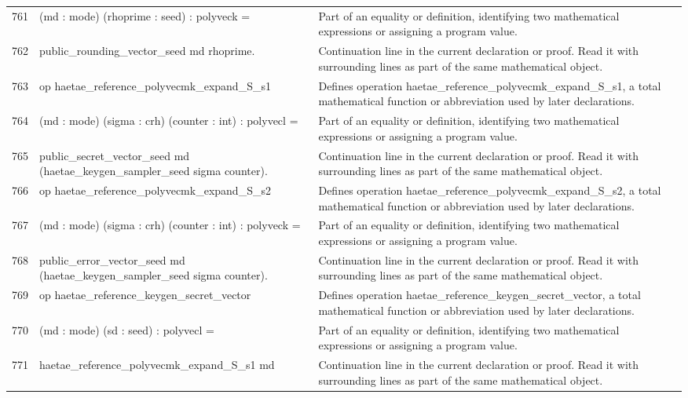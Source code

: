 \documentclass[10pt]{article}
\begin{document}
\begin{longtable}{r L{0.53\textwidth} L{0.37\textwidth}}
761 & {\ttfamily\scriptsize    (md : mode) (rhoprime : seed) : polyveck =} & Part of an equality or definition, identifying two mathematical expressions or assigning a program value. \\
762 & {\ttfamily\scriptsize   public\_rounding\_vector\_seed md rhoprime.} & Continuation line in the current declaration or proof.  Read it with surrounding lines as part of the same mathematical object. \\
763 & {\ttfamily\scriptsize op haetae\_reference\_polyvecmk\_expand\_S\_s1} & Defines operation haetae\_reference\_polyvecmk\_expand\_S\_s1, a total mathematical function or abbreviation used by later declarations. \\
764 & {\ttfamily\scriptsize    (md : mode) (sigma : crh) (counter : int) : polyvecl =} & Part of an equality or definition, identifying two mathematical expressions or assigning a program value. \\
765 & {\ttfamily\scriptsize   public\_secret\_vector\_seed md (haetae\_keygen\_sampler\_seed sigma counter).} & Continuation line in the current declaration or proof.  Read it with surrounding lines as part of the same mathematical object. \\
766 & {\ttfamily\scriptsize op haetae\_reference\_polyvecmk\_expand\_S\_s2} & Defines operation haetae\_reference\_polyvecmk\_expand\_S\_s2, a total mathematical function or abbreviation used by later declarations. \\
767 & {\ttfamily\scriptsize    (md : mode) (sigma : crh) (counter : int) : polyveck =} & Part of an equality or definition, identifying two mathematical expressions or assigning a program value. \\
768 & {\ttfamily\scriptsize   public\_error\_vector\_seed md (haetae\_keygen\_sampler\_seed sigma counter).} & Continuation line in the current declaration or proof.  Read it with surrounding lines as part of the same mathematical object. \\
769 & {\ttfamily\scriptsize op haetae\_reference\_keygen\_secret\_vector} & Defines operation haetae\_reference\_keygen\_secret\_vector, a total mathematical function or abbreviation used by later declarations. \\
770 & {\ttfamily\scriptsize    (md : mode) (sd : seed) : polyvecl =} & Part of an equality or definition, identifying two mathematical expressions or assigning a program value. \\
771 & {\ttfamily\scriptsize   haetae\_reference\_polyvecmk\_expand\_S\_s1 md} & Continuation line in the current declaration or proof.  Read it with surrounding lines as part of the same mathematical object. \\

\end{longtable}
\end{document}
